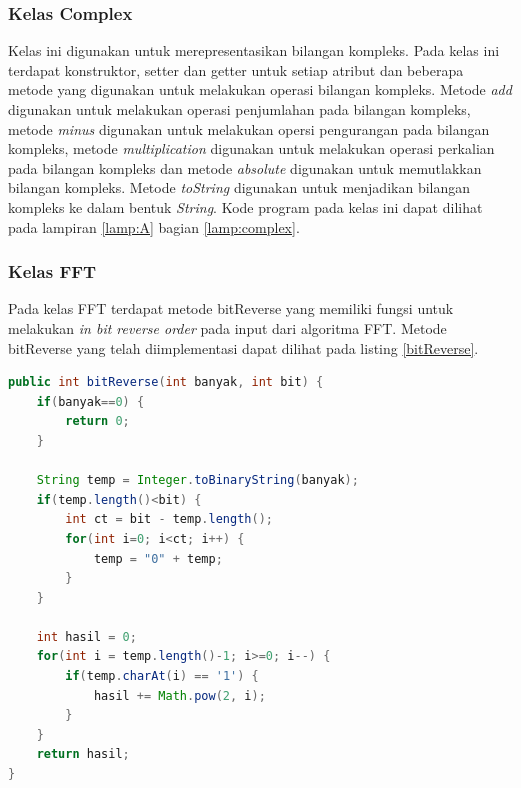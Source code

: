 \subsubsection{Kelas Complex}
Kelas ini digunakan untuk merepresentasikan bilangan kompleks. Pada kelas ini terdapat konstruktor, setter dan getter untuk setiap atribut dan beberapa metode yang digunakan untuk melakukan operasi bilangan kompleks. Metode \textit{add} digunakan untuk melakukan operasi penjumlahan pada bilangan kompleks, metode \textit{minus} digunakan untuk melakukan opersi pengurangan pada bilangan kompleks, metode \textit{multiplication} digunakan untuk melakukan operasi perkalian pada bilangan kompleks dan metode \textit{absolute} digunakan untuk memutlakkan bilangan kompleks. Metode \textit{toString} digunakan untuk menjadikan bilangan kompleks ke dalam bentuk \textit{String}. Kode program pada kelas ini dapat dilihat pada lampiran \ref{lamp:A} bagian \ref{lamp:complex}.

\subsubsection{Kelas FFT}
Pada kelas FFT terdapat metode bitReverse yang memiliki fungsi untuk melakukan \textit{in bit reverse order} pada input dari algoritma FFT. Metode bitReverse yang telah diimplementasi dapat dilihat pada listing \ref{bitReverse}.
\begin{lstlisting}[language=Java, caption=Metode bitReverse(), label=bitReverse]
public int bitReverse(int banyak, int bit) {
	if(banyak==0) {
		return 0;
	}
	
	String temp = Integer.toBinaryString(banyak);
	if(temp.length()<bit) {
		int ct = bit - temp.length();
		for(int i=0; i<ct; i++) {
			temp = "0" + temp;
		}
	}
	
	int hasil = 0;
	for(int i = temp.length()-1; i>=0; i--) {
		if(temp.charAt(i) == '1') {
			hasil += Math.pow(2, i);
		}
	}
	return hasil;
}
\end{lstlisting}

